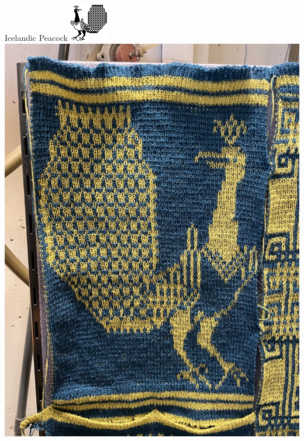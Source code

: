 \documentclass[
    NAME={Dr. Helga Ingimundardóttir},
    EMAIL={helgaingim@hi.is},
    FACULTY={Industrial Engineering},
    TITLE={HiDef Textiles: Reviving Tradition with Innovation},
    SUBTITLE={Empowering Creativity and Sustainability in Textile Production through Digital Transformation},
    SEMINAR={Reykjavík DataBeers},
    DATE={January 25, 2025},
    WIDE={true}
]{HI-LaTeX/hi-beamer}
\begin{document}
\begin{frame}{Icelandic Peacock}
\centering
\href{https://www.instagram.com/p/C9Cf8FFgDZZ/}{
    \includegraphics[height=.7\textheight]{include/thjms5898_246_0.png}
    \hspace{24pt}
    \includegraphics[height=.7\textheight]{include/peacock.jpg}}
\end{frame}
\end{document}
